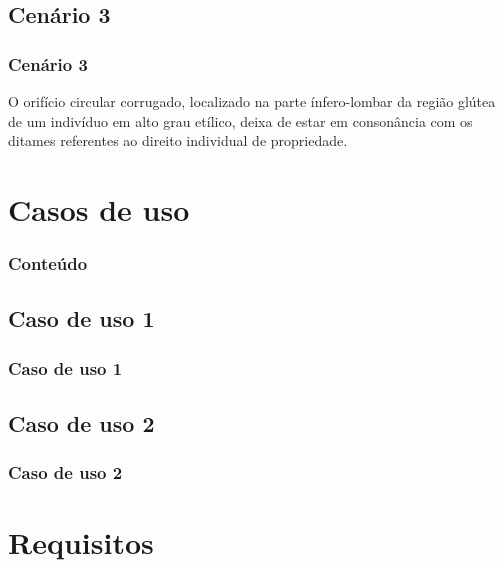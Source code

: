 \documentclass[14pt,beamer]{beamer}
\begin{document}
\subsection{Cenário 3}
\begin{frame}
	\frametitle{Cenário 3}
O orifício circular corrugado, localizado na parte ínfero-lombar da região glútea de um indivíduo em alto grau etílico, deixa de estar em consonância com os ditames referentes ao direito individual de propriedade.

\end{frame}

\section{Casos de uso}

\begin{frame}
	\frametitle{Conteúdo}
	\footnotesize
\end{frame}

\subsection{Caso de uso 1}
\begin{frame}
	\frametitle{Caso de uso 1}
\end{frame}

\subsection{Caso de uso 2}
\begin{frame}
	\frametitle{Caso de uso 2}
\end{frame}

\section{Requisitos}
\end{document}
